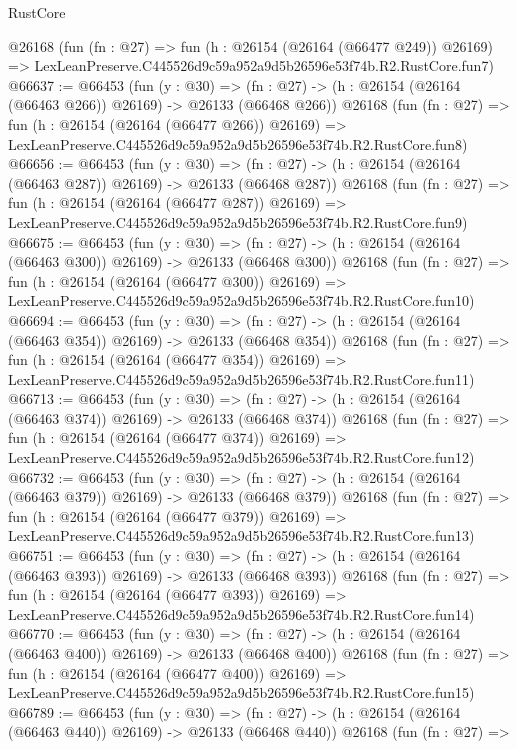 \begin{lexlean}{RustCore}
\begin{coremodule}
    @26168
    (fun (fn : @27) =>
    fun (h : @26154 (@26164 (@66477 @249)) @26169) =>
    LexLeanPreserve.C445526d9c59a952a9d5b26596e53f74b.R2.RustCore.fun7)
@66637 := @66453
    (fun (y : @30) =>
    (fn : @27) -> (h : @26154 (@26164 (@66463 @266)) @26169) -> @26133 (@66468 @266))
    @26168
    (fun (fn : @27) =>
    fun (h : @26154 (@26164 (@66477 @266)) @26169) =>
    LexLeanPreserve.C445526d9c59a952a9d5b26596e53f74b.R2.RustCore.fun8)
@66656 := @66453
    (fun (y : @30) =>
    (fn : @27) -> (h : @26154 (@26164 (@66463 @287)) @26169) -> @26133 (@66468 @287))
    @26168
    (fun (fn : @27) =>
    fun (h : @26154 (@26164 (@66477 @287)) @26169) =>
    LexLeanPreserve.C445526d9c59a952a9d5b26596e53f74b.R2.RustCore.fun9)
@66675 := @66453
    (fun (y : @30) =>
    (fn : @27) -> (h : @26154 (@26164 (@66463 @300)) @26169) -> @26133 (@66468 @300))
    @26168
    (fun (fn : @27) =>
    fun (h : @26154 (@26164 (@66477 @300)) @26169) =>
    LexLeanPreserve.C445526d9c59a952a9d5b26596e53f74b.R2.RustCore.fun10)
@66694 := @66453
    (fun (y : @30) =>
    (fn : @27) -> (h : @26154 (@26164 (@66463 @354)) @26169) -> @26133 (@66468 @354))
    @26168
    (fun (fn : @27) =>
    fun (h : @26154 (@26164 (@66477 @354)) @26169) =>
    LexLeanPreserve.C445526d9c59a952a9d5b26596e53f74b.R2.RustCore.fun11)
@66713 := @66453
    (fun (y : @30) =>
    (fn : @27) -> (h : @26154 (@26164 (@66463 @374)) @26169) -> @26133 (@66468 @374))
    @26168
    (fun (fn : @27) =>
    fun (h : @26154 (@26164 (@66477 @374)) @26169) =>
    LexLeanPreserve.C445526d9c59a952a9d5b26596e53f74b.R2.RustCore.fun12)
@66732 := @66453
    (fun (y : @30) =>
    (fn : @27) -> (h : @26154 (@26164 (@66463 @379)) @26169) -> @26133 (@66468 @379))
    @26168
    (fun (fn : @27) =>
    fun (h : @26154 (@26164 (@66477 @379)) @26169) =>
    LexLeanPreserve.C445526d9c59a952a9d5b26596e53f74b.R2.RustCore.fun13)
@66751 := @66453
    (fun (y : @30) =>
    (fn : @27) -> (h : @26154 (@26164 (@66463 @393)) @26169) -> @26133 (@66468 @393))
    @26168
    (fun (fn : @27) =>
    fun (h : @26154 (@26164 (@66477 @393)) @26169) =>
    LexLeanPreserve.C445526d9c59a952a9d5b26596e53f74b.R2.RustCore.fun14)
@66770 := @66453
    (fun (y : @30) =>
    (fn : @27) -> (h : @26154 (@26164 (@66463 @400)) @26169) -> @26133 (@66468 @400))
    @26168
    (fun (fn : @27) =>
    fun (h : @26154 (@26164 (@66477 @400)) @26169) =>
    LexLeanPreserve.C445526d9c59a952a9d5b26596e53f74b.R2.RustCore.fun15)
@66789 := @66453
    (fun (y : @30) =>
    (fn : @27) -> (h : @26154 (@26164 (@66463 @440)) @26169) -> @26133 (@66468 @440))
    @26168
    (fun (fn : @27) =>

\end{coremodule}
\end{lexlean}
